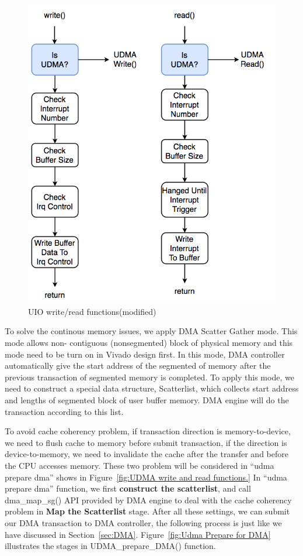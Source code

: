 \begin{figure}[!htb]
  \centering
  \includegraphics[scale=0.5]{images/udma_func_entry.png}
  \caption[UIO write/read functions(modified)]{UIO write/read functions(modified)}
  \label{fig:UIO write and read functions(modified)}
\end{figure}


\newpage
To solve the continous memory issues, we apply DMA Scatter Gather mode. This mode allows non-
contiguous (nonsegmented) block of physical memory and this mode need to be turn on in Vivado 
design first. In this mode, DMA controller automatically give the start address of the 
segmented of memory after the previous transaction of segmented memory is completed. To 
apply this mode, we need to construct a special data structure, Scatterlist, which collects 
start address and lengths of segmented block of user buffer memory. DMA engine will do the
transaction according to this list. 

To avoid cache coherency problem, if transaction direction is memory-to-device, we need to flush 
cache to memory before submit transaction, if the direction is device-to-memory, we need to invalidate 
the cache after the transfer and before the CPU accesses memory. 
{}
These two problem will be considered in ``udma prepare dma'' shows in Figure~\ref{fig:UDMA write and read functions.}
In ``udma prepare dma'' function, we first \textbf{construct the scatterlist}, and call dma\_map\_sg() API provided by DMA engine to deal with the cache coherency problem in \textbf{Map the Scatterlist} stage. After all these settings, we can submit our DMA transaction to DMA controller, the following process is just like we have discussed in Section~\ref{sec:DMA}. Figure~\ref{fig:Udma Prepare for DMA} illustrates the stages in UDMA\_prepare\_DMA() function.

